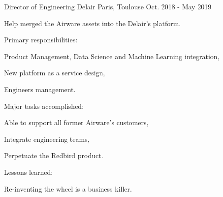 \begin{cventries}
  \cventry
    {Director of Engineering} %
    {Delair} %
    {Paris, Toulouse} %
    {Oct. 2018 - May 2019} %
    {
      \begin{cvitems} %
        \item {Help merged the Airware assets into the Delair's platform.}
        \item {Primary responsibilities:}
        \begin{cvsubitems}
          \item {Product Management, Data Science and Machine Learning integration,}
          \item {New platform as a service design,}
          \item {Engineers management.}
        \end{cvsubitems}
        \item {Major tasks accomplished:}
        \begin{cvsubitems}
          \item {Able to support all former Airware's customers,}
          \item {Integrate engineering teams,}
          \item {Perpetuate the Redbird product.}
        \end{cvsubitems}
        \item {Lessons learned:}
        \begin{cvsubitems}
          \item {Re-inventing the wheel is a business killer.}
      \end{cvsubitems}
      \end{cvitems}
    }


\end{cventries}
